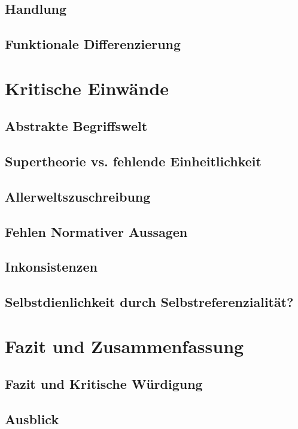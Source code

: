 \documentclass[a4paper,12pt]{article}
\begin{document}
\subsection{Handlung}
\subsection{Funktionale Differenzierung}

\section{Kritische Einwände}
\subsection{Abstrakte Begriffswelt}
\subsection{Supertheorie vs. fehlende Einheitlichkeit}
\subsection{Allerweltszuschreibung}
\subsection{Fehlen Normativer Aussagen}
\subsection{Inkonsistenzen}
\subsection{Selbstdienlichkeit durch Selbstreferenzialität?}
\newpage

\section{Fazit und Zusammenfassung}
\subsection{Fazit und Kritische Würdigung}
\subsection{Ausblick}


\newpage

\nocite{*}
\printbibliography
% 
%
\end{document}
